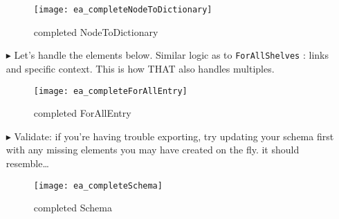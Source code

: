\begin{itemize}
\begin{figure}[htbp]
\begin{center}
  \texttt{[image: ea\_completeNodeToDictionary]}
  \caption{completed NodeToDictionary}
  \label{ea:NodeToDictionary_Complete}
\end{center}
\end{figure}

\item[$\blacktriangleright$] Let's handle the elements below. Similar logic as to \texttt{ForAllShelves} : links and specific context. This is how THAT also
handles multiples.

\begin{figure}[htbp]
\begin{center}
  \texttt{[image: ea\_completeForAllEntry]}
  \caption{completed ForAllEntry}
  \label{ea:ForAllEntry_Complete}
\end{center}
\end{figure}

\item[$\blacktriangleright$] Validate: if you're having trouble exporting, try updating your schema first with any missing elements you may have created on the
fly. it should resemble\ldots

\begin{figure}[htbp]
\begin{center}
  \texttt{[image: ea\_completeSchema]}
  \caption{completed Schema}
  \label{ea:Schema_Complete}
\end{center}
\end{figure}



\end{itemize}


